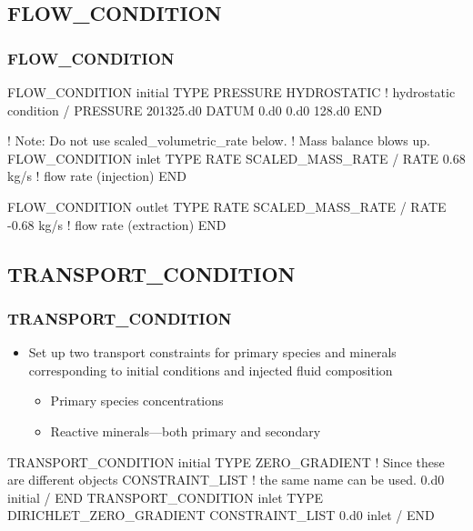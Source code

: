 \documentclass{beamer}
\newcommand\bluecomment[1]{{{\color{blue} #1}}}
\newcommand\greencomment[1]{{{\color{green} #1}}}
\begin{document}
\subsection{FLOW\_CONDITION}

\begin{frame}\frametitle{\bf FLOW\_CONDITION}

\begin{semiverbatim}
FLOW_CONDITION initial
  TYPE
    PRESSURE HYDROSTATIC \bluecomment{! hydrostatic condition}
  /
  PRESSURE 201325.d0
  DATUM 0.d0 0.d0 128.d0
END

\newpage
! Note: Do not use scaled_volumetric_rate below.
!       Mass balance blows up.
FLOW_CONDITION inlet
  TYPE
    RATE SCALED_MASS_RATE
  /
  RATE 0.68 kg/s \bluecomment{! flow rate (injection)}
END

FLOW_CONDITION outlet
  TYPE
    RATE SCALED_MASS_RATE
  /
  RATE -0.68 kg/s \bluecomment{! flow rate (extraction)}
END

\end{semiverbatim}
\end{frame}

\subsection{TRANSPORT\_CONDITION}

\begin{frame}[fragile]\frametitle{\bf TRANSPORT\_CONDITION}
\vspace{-1mm}
\begin{itemize}
  \item Set up two transport constraints for primary species and minerals corresponding to initial conditions and injected fluid composition
   \begin{itemize}
     \item Primary species concentrations
     \item Reactive minerals---both primary and secondary
   \end{itemize}
\end{itemize}
\vspace{-3mm}
\begin{semiverbatim}
TRANSPORT_CONDITION \greencomment{initial} 
  TYPE ZERO_GRADIENT  \bluecomment{! Since these are different objects}
  CONSTRAINT_LIST     \bluecomment{!   the same name can be used.}
    0.d0 \greencomment{initial}
  /
END
\vspace{-3mm}
TRANSPORT_CONDITION \greencomment{inlet}
  TYPE DIRICHLET_ZERO_GRADIENT
  CONSTRAINT_LIST
    0.d0 \greencomment{inlet}
  /
END
\end{semiverbatim}
\end{frame}
\end{document}
